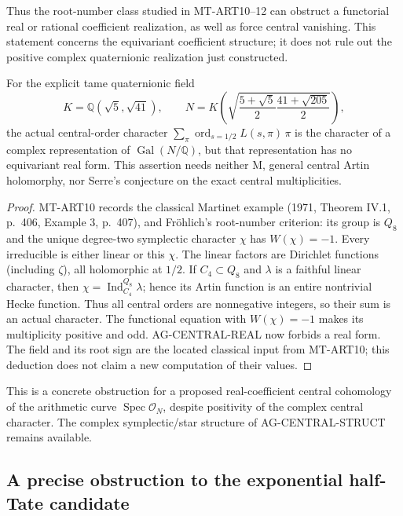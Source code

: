 Thus the root-number class studied in MT-ART10--12 can obstruct
a functorial real or rational coefficient realization, as well
as force central vanishing.  This statement concerns the
equivariant coefficient structure; it does not rule out the
positive complex quaternionic realization just constructed.

\begin{proposition}
For the explicit tame quaternionic field
\[
 K=\mathbb Q(\sqrt5,\sqrt{41}),\qquad
 N=K\left(\sqrt{\frac{5+\sqrt5}{2}
                         \frac{41+\sqrt{205}}{2}}\right),
\]
the actual central-order character
$\sum_\pi\operatorname{ord}_{s=1/2}L(s,\pi)\,\pi$ is the
character of a complex representation of $\operatorname{Gal}(N/\mathbb Q)$,
but that representation has no equivariant real form.
This assertion needs neither M, general central Artin holomorphy,
nor Serre's conjecture on the exact central multiplicities.
\end{proposition}
\begin{proof}
MT-ART10 records the classical Martinet example (1971,
Theorem IV.1, p.~406, Example 3, p.~407), and Fr\"ohlich's
root-number criterion: its group is $Q_8$ and the unique
degree-two symplectic character $\chi$ has $W(\chi)=-1$.
Every irreducible is either linear or this $\chi$.
The linear factors are Dirichlet functions (including $\zeta$),
all holomorphic at $1/2$.  If $C_4\subset Q_8$ and $\lambda$
is a faithful linear character, then
$\chi=\operatorname{Ind}_{C_4}^{Q_8}\lambda$; hence its
Artin function is an entire nontrivial Hecke function.
Thus all central orders are nonnegative integers, so their
sum is an actual character.  The functional equation with
$W(\chi)=-1$ makes its multiplicity positive and odd.
AG-CENTRAL-REAL now forbids a real form.  The field and its
root sign are the located classical input from MT-ART10;
this deduction does not claim a new computation of their values.
\end{proof}

This is a concrete obstruction for a proposed real-coefficient
central cohomology of the arithmetic curve
$\operatorname{Spec}\mathcal O_N$, despite positivity of the
complex central character.  The complex symplectic/star
structure of AG-CENTRAL-STRUCT remains available.

\subsection{A precise obstruction to the exponential half-Tate candidate}

